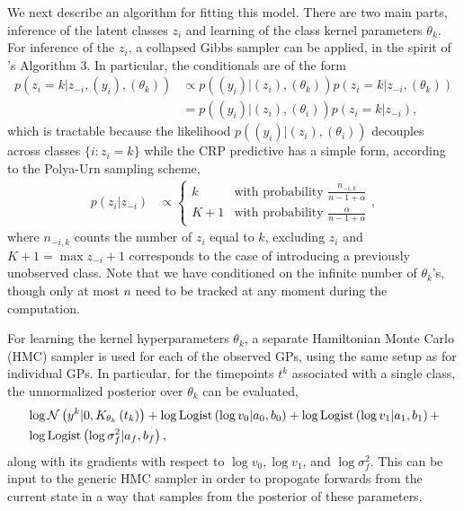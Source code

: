 We next describe an algorithm for fitting this model. There are two main parts,
inference of the latent classes $z_i$ and learning of the class kernel
parameters $\theta_k$. For inference of the $z_i$, a collapsed Gibbs sampler can
be applied, in the spirit of \cite{neal2000markov}'s Algorithm 3. In
particular, the conditionals are of the form
\begin{align}
  p\left(z_i = k \vert z_{-i}, \left(y_i\right), \left(\theta_k\right)\right) &\propto p\left(\left(y_i\right) \vert \left(z_i\right),  \left(\theta_k\right)\right)
  p\left(z_i = k \vert z_{-i}, \left(\theta_k\right)\right) \nonumber \\
  &= p\left(\left(y_i\right) \vert \left(z_i\right), \left(\theta_i\right)\right)p\left(z_i = k \vert z_{-i}\right), \label{eq:igp_conditional}
\end{align}
which is tractable because the likelihood $p\left(\left(y_i\right) \vert
\left(z_i\right), \left(\theta_i\right)\right)$ decouples across classes $\{i :
z_i = k\}$ while the CRP predictive has a simple form, according to the
Polya-Urn sampling scheme,
\begin{align*}
  p\left(z_i\vert z_{-i}\right) &\propto \begin{cases}
    k &\text{with probability } \frac{n_{-i, k}}{n - 1 + \alpha} \\
    K + 1 &\text{with probability } \frac{\alpha}{n - 1 + \alpha}
    \end{cases},
\end{align*}
where $n_{-i, k}$ counts the number of $z_i$ equal to $k$, excluding $z_i$ and
$K + 1 = \max{z_{-i}} + 1$ corresponds to the case of introducing a previously
unobserved class. Note that we have conditioned on the infinite number of
$\theta_k$'s, though only at most $n$ need to be tracked at any moment during
the computation.

For learning the kernel hyperparameters $\theta_k$, a separate Hamiltonian Monte
Carlo (HMC) sampler is used for each of the observed GPs, using the same setup
as \cite{rasmussen2006gaussian} for individual GPs. In particular, for the
timepoints $t^k$ associated with a single class, the unnormalized posterior over
$\theta_k$ can be evaluated,
\begin{align*}
  &\log \mathcal{N}\left(y^k \vert 0, K_{\theta_k}\left(t_k\right)\right) +
  \log \text{Logist}\left(\log v_0 \vert a_0, b_0\right) +
  \log \text{Logist}\left(\log v_1 \vert a_1, b_1\right) +\\
  &\log \text{Logist}\left(\log \sigma_f^2 \vert a_f, b_f\right),
\end{align*}
along with its gradients with respect to $\log v_0, \log v_1$, and $\log
\sigma_f^2$. This can be input to the generic HMC sampler in order to propogate
forwards from the current state in a way that samples from the posterior of
these parameters.

